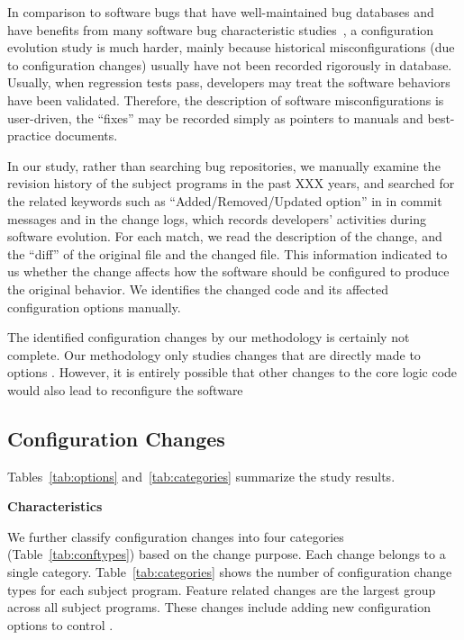 In comparison to software bugs that have well-maintained
bug databases and have benefits from many
software bug characteristic studies~\cite{},
a configuration evolution study is much harder, mainly
because historical misconfigurations (due
to configuration changes) usually have not been
recorded rigorously in database. Usually, when
regression tests pass, developers may treat the
software behaviors have been validated. Therefore,
the description of software misconfigurations is user-driven,
the ``fixes'' may be recorded simply as pointers
to manuals and best-practice documents.

In our study, rather than searching bug repositories,
we manually examine the revision history of the subject programs
in the past XXX years, and searched for the related
keywords such as ``Added/Removed/Updated option'' in
in commit messages and in the change logs,
which records developers' activities
during software evolution. For each match,
we read the description of the change,
and the ``diff'' of the original file and the
changed file. This information indicated
to us whether the change affects how the
software should be configured to produce
the original behavior. We identifies the
changed code and its affected configuration options
manually.

The identified configuration changes by our methodology is certainly not complete.
Our methodology only studies changes that are directly made to options .
However, it is entirely possible that other
changes to the core logic code would also
 lead to reconfigure the software


\subsection{Configuration Changes}

Tables~\ref{tab:options} and~\ref{tab:categories}
summarize the study results.


\vspace{1mm}
\noindent\textbf{Characteristics}


We further classify configuration changes into
four categories (Table~\ref{tab:conftypes}) based
on the change purpose. Each change belongs to a single category.
Table~\ref{tab:categories} shows the number of
configuration change types for each subject program.
Feature related changes are the largest group across
all subject programs. These changes include
adding new configuration options to control .


